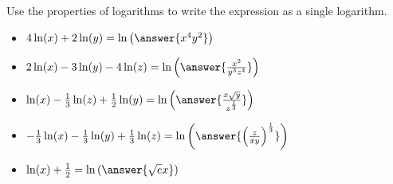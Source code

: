 \documentclass{ximera}
\author{Carl Stitz \and Jeff Zeager \and Bart Snapp \and Matthew Carr}
\begin{document}
\begin{exercise}
Use the properties of logarithms to write the expression as a single
logarithm. 

\begin{itemize}
\item $4\ln(x) + 2\ln(y)=\ln\left(\answer{x^4y^2}\right)$ 
\item $2 \ln(x) -3 \ln(y) - 4\ln(z)=\ln\left(\answer{\frac{x^2}{y^3z^4}}\right)$
\item $\ln(x) - \frac{1}{3} \ln(z) + \frac{1}{2} \ln(y)=\ln\left(\answer{\frac{x\sqrt{y}}{z^{\frac{1}{3}}}}\right)$
\item $-\frac{1}{3} \ln(x) - \frac{1}{3}\ln(y) + \frac{1}{3} \ln(z)=\ln\left(\answer{\Bigl(\frac{z}{xy}\Bigr)^{\frac{1}{3}}}\right)$
\item $\ln(x) + \frac{1}{2}=\ln\left(\answer{\sqrt{e}x}\right)$  
\end{itemize}

\end{exercise}
\end{document}
